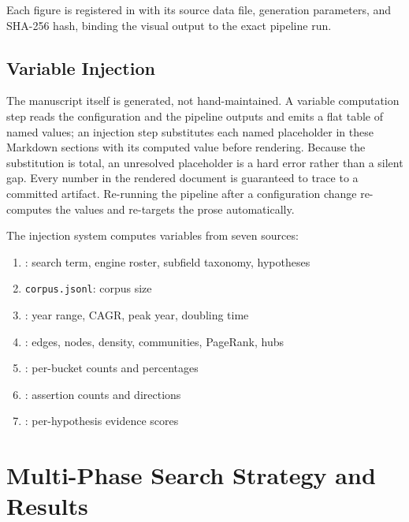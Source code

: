\documentclass[
]{article}
\providecommand{\tightlist}{%
  \setlength{\itemsep}{0pt}\setlength{\parskip}{0pt}}
\begin{document}
Each figure is registered in  with its
source data file, generation parameters, and SHA-256 hash, binding the
visual output to the exact pipeline run.

\subsection{Variable Injection}\label{variable-injection}

The manuscript itself is generated, not hand-maintained. A variable
computation step reads the configuration and the pipeline outputs and
emits a flat table of named values; an injection step substitutes each
named placeholder in these Markdown sections with its computed value
before rendering. Because the substitution is total, an unresolved
placeholder is a hard error rather than a silent gap. Every number in
the rendered document is guaranteed to trace to a committed artifact.
Re-running the pipeline after a configuration change re-computes the
values and re-targets the prose automatically.

The injection system computes variables from seven sources:

\begin{enumerate}
\def\labelenumi{\arabic{enumi}.}
\tightlist
\item
  : search term, engine roster, subfield
  taxonomy, hypotheses
\item
  \texttt{corpus.jsonl}: corpus size
\item
  : year range, CAGR, peak year,
  doubling time
\item
  : edges, nodes, density, communities,
  PageRank, hubs
\item
  : per-bucket counts and
  percentages
\item
  : assertion counts and directions
\item
  : per-hypothesis evidence scores
\end{enumerate}

\newpage

\section{Multi-Phase Search Strategy and
Results}\label{multi-phase-search-strategy-and-results}
\end{document}
